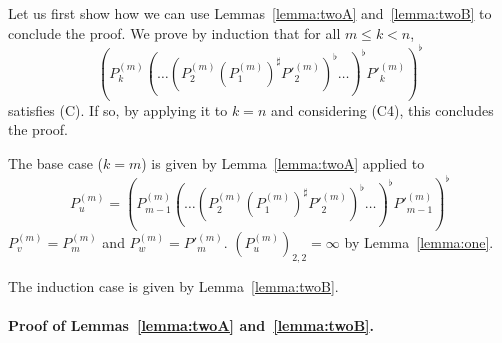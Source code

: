 \documentclass[10pt,a4paper]{amsart}
\theoremstyle{definition}
\numberwithin{equation}{section}
\theoremstyle{remark}
\theoremstyle{remark}
\begin{document}
Let us first show how we can use Lemmas~\ref{lemma:twoA} and~\ref{lemma:twoB} to conclude the proof. We prove by induction that for all $m \leq k < n$, 
$$(P^{(m)}_{k} (\ldots (P^{(m)}_2 (P^{(m)}_1)^\sharp P'^{(m)}_2)^\flat \ldots)^\flat P'^{(m)}_{k})^\flat$$
satisfies (C). If so, by applying it to $k=n$ and considering (C4), this concludes the proof.

The base case ($k=m$) is given by Lemma~\ref{lemma:twoA} applied to 
$$P^{(m)}_u = (P^{(m)}_{m-1} (\ldots (P^{(m)}_2 (P^{(m)}_1)^\sharp P'^{(m)}_2)^\flat \ldots)^\flat P'^{(m)}_{m-1})^\flat$$
$P^{(m)}_v = P^{(m)}_m$ and $P^{(m)}_w = P'^{(m)}_m$. $(P^{(m)}_u)_{2,2} = \infty$ by Lemma~\ref{lemma:one}.

The induction case is given by Lemma~\ref{lemma:twoB}. 

\paragraph{Proof of Lemmas~\ref{lemma:twoA} and~\ref{lemma:twoB}.}
\end{document}
